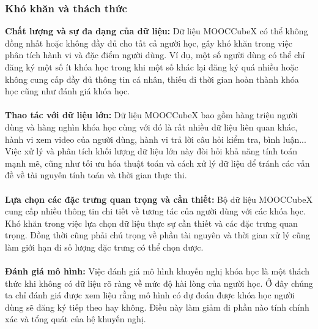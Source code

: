 \subsubsection{Khó khăn và thách thức}
\textbf{Chất lượng và sự đa dạng của dữ liệu:} Dữ liệu MOOCCubeX có thể không đồng nhất hoặc không đầy đủ cho tất cả người học, gây khó khăn trong việc phân tích hành vi và đặc điểm người dùng. Ví dụ, một số người dùng có thể chỉ đăng ký một số ít khóa học trong khi một số khác lại đăng ký quá nhiều hoặc không cung cấp đầy đủ thông tin cá nhân, thiếu đi thời gian hoàn thành khóa học cũng như đánh giá khóa học.\\
\\
\textbf{Thao tác với dữ liệu lớn:} Dữ liệu MOOCCubeX bao gồm hàng triệu người dùng và hàng nghìn khóa học cùng với đó là rất nhiều dữ liệu liên quan khác, hành vi xem video của người dùng, hành vi trả lời câu hỏi kiểm tra, bình luận... Việc xử lý và phân tích khối lượng dữ liệu lớn này đòi hỏi khả năng tính toán mạnh mẽ, cũng như tối ưu hóa thuật toán và cách xử lý dữ liệu để tránh các vấn đề về tài nguyên tính toán và thời gian thực thi.\\
\\
\textbf{Lựa chọn các đặc trưng quan trọng và cần thiết:} Bộ dữ liệu MOOCCubeX cung cấp nhiều thông tin chi tiết về tương tác của người dùng với các khóa học. Khó khăn trong việc lựa chọn dữ liệu thực sự cần thiết và các đặc trưng quan trọng. Đồng thời cũng phải chú trọng về phần tài nguyên và thời gian xử lý cũng làm giới hạn đi số lượng đặc trưng có thể chọn được.\\
\\
\textbf{Đánh giá mô hình:} Việc đánh giá mô hình khuyến nghị khóa học là một thách thức khi không có dữ liệu rõ ràng về mức độ hài lòng của người học. Ở đây chúng ta chỉ đánh giá được xem liệu rằng mô hình có dự đoán được khóa học người dùng sẽ đăng ký tiếp theo hay không. Điều này làm giảm đi phần nào tính chính xác và tổng quát của hệ khuyến nghị.
